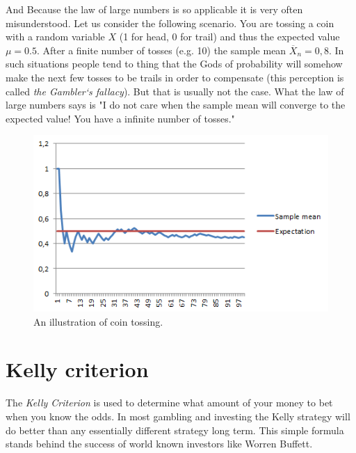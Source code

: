 \documentclass[12pt, a4paper,leqno]{report}
\theoremstyle{normal}
\theoremstyle{normal}
\begin{document}
	And Because the law of large numbers is so applicable it is very often misunderstood. Let us consider the following scenario. You are tossing a coin with a random variable $X$ (1 for head, 0 for trail) and thus the expected value $\mu = 0.5$. After a finite number of tosses (e.g. 10) the sample mean $\overline{X}_n = 0,8$. In such situations people tend to thing that the Gods of probability will somehow make the next few tosses to be trails in order to compensate (this perception is called \textit{the Gambler`s fallacy}). But that is usually not the case. What the law of large numbers says is "I do not care when the sample mean will converge to the expected value! You have a infinite number of tosses."
	\begin{figure}[h!]
		\caption{An illustration of coin tossing.}
		\centering
			\includegraphics[width=12cm]{graphic.png}
	\end{figure}	
	
	\section{Kelly criterion}
	The \textit{Kelly Criterion} is used to determine what amount of your money to bet when you know the odds. In most gambling and investing the Kelly strategy will do better than any essentially different strategy long term. This simple formula stands behind the success of world known investors like Worren Buffett.
	
\end{document}
